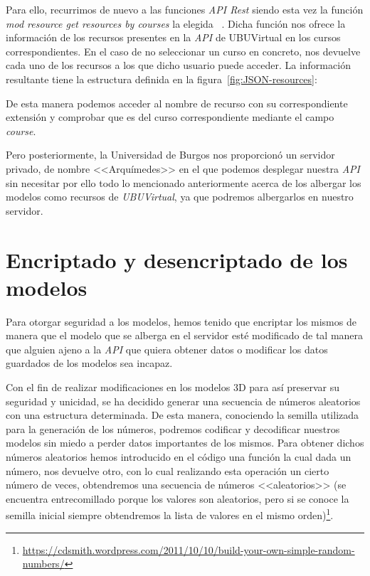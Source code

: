 Para ello, recurrimos de nuevo a las funciones \textit{API Rest} siendo esta vez la función \textit{mod resource get resources by courses} la elegida ~\cite{moodle:web-service-api-functions}. Dicha función nos ofrece la información de los recursos presentes en la \textit{API} de UBUVirtual en los cursos correspondientes. En el caso de no seleccionar un curso en concreto, nos devuelve cada uno de los recursos a los que dicho usuario puede acceder. La información resultante tiene la estructura definida en la figura~\ref{fig:JSON-resources}:

De esta manera podemos acceder al nombre de recurso con su correspondiente extensión y comprobar que es del curso correspondiente mediante el campo \textit{course}.

Pero posteriormente, la Universidad de Burgos nos proporcionó un servidor privado, de nombre <<Arquímedes>> en el que podemos desplegar nuestra \textit{API} sin necesitar por ello todo lo mencionado anteriormente acerca de los albergar los modelos como recursos de \textit{UBUVirtual}, ya que podremos albergarlos en nuestro servidor.

\section{Encriptado y desencriptado de los modelos}
Para otorgar seguridad a los modelos, hemos tenido que encriptar los mismos de manera que el modelo que se alberga en el servidor esté modificado de tal manera que alguien ajeno a la \textit{API} que quiera obtener datos o modificar los datos guardados de los modelos sea incapaz.

Con el fin de realizar modificaciones en los modelos 3D para así preservar su seguridad y unicidad, se ha decidido generar una secuencia de números aleatorios con una estructura determinada. De esta manera, conociendo la semilla utilizada para la generación de los números, podremos codificar y decodificar nuestros modelos sin miedo a perder datos importantes de los mismos. Para obtener dichos números aleatorios hemos introducido en el código una función la cual dada un número, nos devuelve otro, con lo cual realizando esta operación un cierto número de veces, obtendremos una secuencia de números <<aleatorios>> (se encuentra entrecomillado porque los valores son aleatorios, pero si se conoce la semilla inicial siempre obtendremos la lista de valores en el mismo orden)\footnote{\url{https://cdsmith.wordpress.com/2011/10/10/build-your-own-simple-random-numbers/}}.

